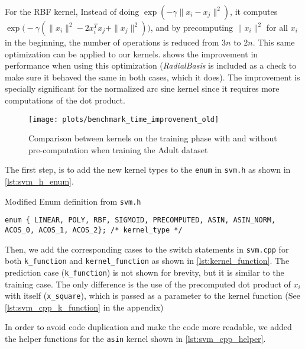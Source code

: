 For the RBF kernel, Instead of doing $\exp\left(-\gamma\|x_i - x_j\|^2\right)$,
it computes $\exp\bigl(-\gamma(\|x_i\|^2 - 2x_i^Tx_j + \|x_j\|^2)\bigr)$, and by
precomputing $\|x_i\|^2$ for all $x_i$ in the beginning, the number of
operations is reduced from $3n$ to $2n$. This same optimization can be applied
to our kernels.  shows the improvement in performance
when using this optimization (\emph{RadialBasis} is included as a check to make
sure it behaved the same in both cases, which it does).
The improvement is specially significant for the
normalized arc sine kernel since it requires more computations of the
dot product.

\begin{figure}[H]
    \texttt{[image: plots/benchmark\_time\_improvement\_old]}
    \caption{Comparison between kernels on the training phase with and without
        pre-computation when training the Adult dataset}%
    \label{fig:c_improvement}
\end{figure}

The first step, is to add the new kernel types to the \texttt{enum} in
\texttt{svm.h} as shown in \cref{lst:svm_h_enum}.
\begin{listing}[H]
    \caption{Modified Enum definition from \texttt{svm.h}}
    \label{lst:svm_h_enum}
    \begin{verbatim}
enum { LINEAR, POLY, RBF, SIGMOID, PRECOMPUTED, ASIN, ASIN_NORM, ACOS_0, ACOS_1, ACOS_2}; /* kernel_type */
\end{verbatim}
\end{listing}
Then, we add the corresponding cases to the switch statements in
\texttt{svm.cpp} for both \texttt{k\_function} and \texttt{kernel\_function} as
shown in \cref{lst:kernel_function}. The prediction case (\texttt{k\_function})
is not shown for brevity, but it is similar to the training case. The only
difference is the use of the precomputed dot product of $x_i$ with itself
(\texttt{x\_square}), which is passed as a parameter to the kernel function (See
\cref{lst:svm_cpp_k_function} in the appendix)

In order to avoid code duplication and make the code more readable, we added the
helper functions for the \texttt{asin} kernel shown in
\cref{lst:svm_cpp_helper}.

